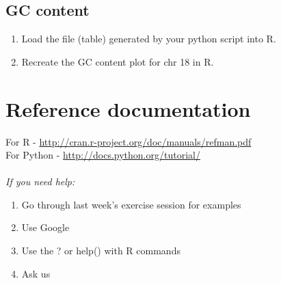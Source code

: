\documentclass[a4paper,11pt]{article}
\begin{document}
\subsection{GC content}
\begin{enumerate}
\item Load the file (table) generated by your python script into R.
\item Recreate the GC content plot for chr 18 in R.
\end{enumerate}




\section{Reference documentation}
For R - \url{http://cran.r-project.org/doc/manuals/refman.pdf}\\
For Python - \url{http://docs.python.org/tutorial/}\\ \\
\emph{If you need help:}
\begin{enumerate}
\item Go through last week's exercise session for examples
\item Use Google
\item Use the ? or help() with R commands
\item Ask us
\end{enumerate}
\end{document}
